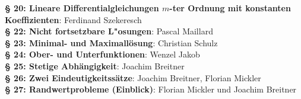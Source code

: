 \documentclass[a4paper,twoside,DIV15,BCOR12mm]{scrbook}
\begin{document}
\textbf{§ 20: Lineare Differentialgleichungen $m$-ter Ordnung mit konstanten Koeffizienten}: Ferdinand Szekeresch\\
\textbf{§ 22: Nicht fortsetzbare L"osungen}: Pascal Maillard\\
\textbf{§ 23: Minimal- und Maximallösung}: Christian Schulz\\
\textbf{§ 24: Ober- und Unterfunktionen}: Wenzel Jakob\\
\textbf{§ 25: Stetige Abhängigkeit}: Joachim Breitner\\
\textbf{§ 26: Zwei Eindeutigkeitssätze}: Joachim Breitner, Florian Mickler\\
\textbf{§ 27: Randwertprobleme (Einblick)}: Florian Mickler und Joachim Breitner\\
\end{document}
